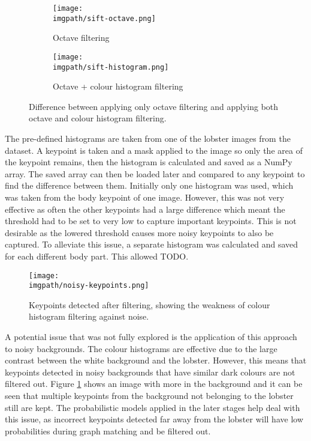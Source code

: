 \begin{figure}[H]
	\begin{subfigure}{0.5\textwidth}
	\texttt{[image: \\imgpath/sift-octave.png]}
	\caption{Octave filtering}
	\end{subfigure}
	\hspace*{\fill}
	\begin{subfigure}{0.5\textwidth}
	\texttt{[image: \\imgpath/sift-histogram.png]}
	\caption{Octave + colour histogram filtering}
	\end{subfigure}
\caption{Difference between applying only octave filtering and applying both octave and colour histogram filtering.}
\end{figure}
\noindent
The pre-defined histograms are taken from one of the lobster images from the dataset. A keypoint is taken and a mask applied to the image so only the area of the keypoint remains, then the histogram is calculated and saved as a NumPy array. The saved array can then be loaded later and compared to any keypoint to find the difference between them. Initially only one histogram was used, which was taken from the body keypoint of one image. However, this was not very effective as often the other keypoints had a large difference which meant the threshold had to be set to very low to capture important keypoints. This is not desirable as the lowered threshold causes more noisy keypoints to also be captured. To alleviate this issue, a separate histogram was calculated and saved for each different body part. This allowed TODO.
\begin{figure}[H]
\centering
\texttt{[image: \\imgpath/noisy-keypoints.png]}
\caption{Keypoints detected after filtering, showing the weakness of colour histogram filtering against noise.}
\label{fig:noisy-histogram}
\end{figure}
\noindent
A potential issue that was not fully explored is the application of this approach to noisy backgrounds. The colour histograms are effective due to the large contrast between the white background and the lobster. However, this means that keypoints detected in noisy backgrounds that have similar dark colours are not filtered out. Figure \ref{fig:noisy-histogram} shows an image with more in the background and it can be seen that multiple keypoints from the background not belonging to the lobster still are kept. The probabilistic models applied in the later stages help deal with this issue, as incorrect keypoints detected far away from the lobster will have low probabilities during graph matching and be filtered out. 

